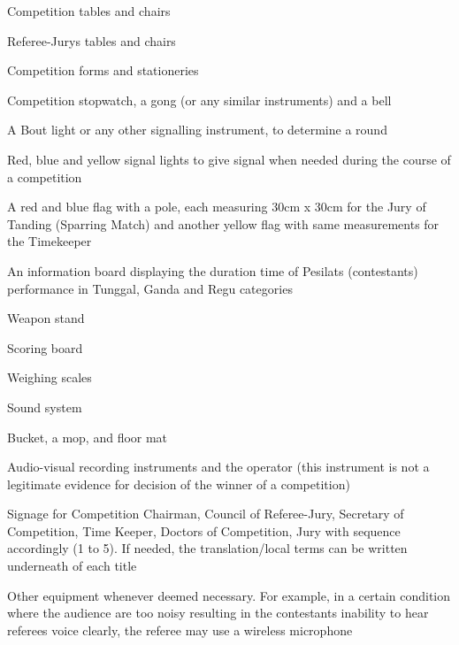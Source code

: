 \begin{legal}
    \begin{legal}
    \item Competition tables and chairs
    \item Referee-Jurys tables and chairs
    \item Competition forms and stationeries
    \item Competition stopwatch, a gong (or any similar instruments) and a bell
    \item A Bout light or any other signalling instrument, to determine a round
    \item Red, blue and yellow signal lights to give signal when needed during the course of a competition
    \item A red and blue flag with a pole, each measuring 30cm x 30cm for the Jury of Tanding (Sparring Match) and another yellow flag with same measurements for the Timekeeper
    \item An information board displaying the duration time of Pesilats (contestants) performance in Tunggal, Ganda and Regu categories
    \item Weapon stand
    \item Scoring board
    \item Weighing scales
    \item Sound system
    \item Bucket, a mop, and floor mat
    \item Audio-visual recording instruments and the operator (this instrument is not a legitimate evidence for decision of the winner of a competition)
    \item Signage for Competition Chairman, Council of Referee-Jury, Secretary of Competition, Time Keeper, Doctors of Competition, Jury with sequence accordingly (1 to 5). If needed, the translation/local terms can be written underneath of each title
    \item   Other equipment whenever deemed necessary. For example, in a certain condition where the audience are too noisy resulting in the contestants inability to hear referees voice clearly, the referee may use a wireless microphone
    \end{legal}
\end{legal}

